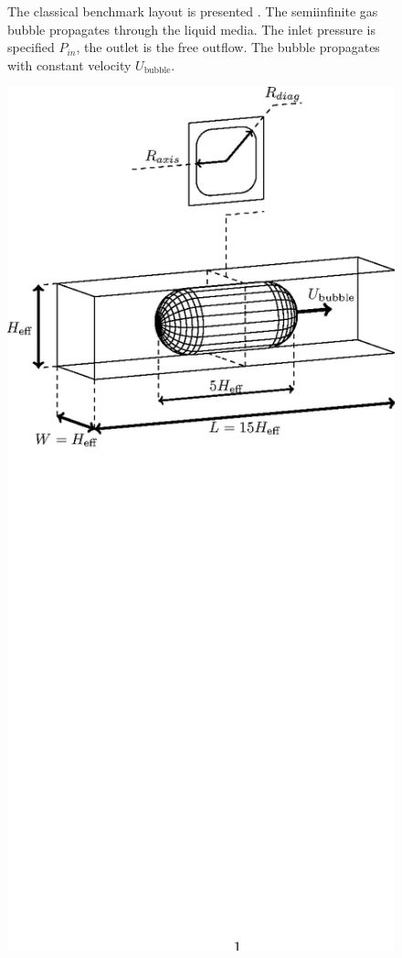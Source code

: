 \documentclass{article}
\begin{document}
\begin{figure}[ht]
\caption{The classical benchmark layout is presented . The semiinfinite gas bubble
propagates through the liquid media. The inlet pressure is specified $P_{in}$, the outlet is the
free outflow. The bubble propagates with constant velocity $U_{\mathrm{bubble}}$. 
\label{fig:classical:benchmark}}
\end{figure}
\begin{figure}[ht]
\includegraphics*[bb=152 470 410 713,width=\textwidth]{Figures/benchmark_lbm.eps}

\end{figure}
\end{document}
